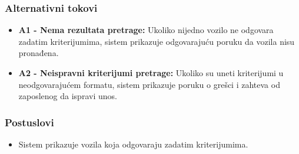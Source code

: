 \subsubsection{Alternativni tokovi}

\begin{itemize}
    \item \textbf{A1 - Nema rezultata pretrage:}
    Ukoliko nijedno vozilo ne odgovara zadatim kriterijumima, sistem prikazuje odgovarajuću poruku da vozila nisu pronađena.

    \item \textbf{A2 - Neispravni kriterijumi pretrage:}
    Ukoliko su uneti kriterijumi u neodgovarajućem formatu, sistem prikazuje poruku o grešci i zahteva od zaposlenog da ispravi unos.
\end{itemize}

\subsubsection{Postuslovi}

\begin{itemize}
    \item Sistem prikazuje vozila koja odgovaraju zadatim kriterijumima.
\end{itemize}